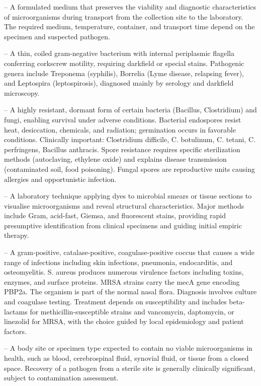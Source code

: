 -- A formulated medium that preserves the viability and diagnostic characteristics of microorganisms during transport from the collection site to the laboratory. The required medium, temperature, container, and transport time depend on the specimen and suspected pathogen.

-- A thin, coiled gram-negative bacterium with internal periplasmic flagella conferring corkscrew motility, requiring darkfield or special stains. Pathogenic genera include Treponema (syphilis), Borrelia (Lyme disease, relapsing fever), and Leptospira (leptospirosis), diagnosed mainly by serology and darkfield microscopy.

-- A highly resistant, dormant form of certain bacteria (Bacillus, Clostridium) and fungi, enabling survival under adverse conditions. Bacterial endospores resist heat, desiccation, chemicals, and radiation; germination occurs in favorable conditions. Clinically important: Clostridium difficile, C. botulinum, C. tetani, C. perfringens, Bacillus anthracis. Spore resistance requires specific sterilization methods (autoclaving, ethylene oxide) and explains disease transmission (contaminated soil, food poisoning). Fungal spores are reproductive units causing allergies and opportunistic infection.

-- A laboratory technique applying dyes to microbial smears or tissue sections to visualise microorganisms and reveal structural characteristics. Major methods include Gram, acid-fast, Giemsa, and fluorescent stains, providing rapid presumptive identification from clinical specimens and guiding initial empiric therapy.

-- A gram-positive, catalase-positive, coagulase-positive coccus that causes a wide range of infections including skin infections, pneumonia, endocarditis, and osteomyelitis. S. aureus produces numerous virulence factors including toxins, enzymes, and surface proteins. MRSA strains carry the mecA gene encoding PBP2a. The organism is part of the normal nasal flora. Diagnosis involves culture and coagulase testing. Treatment depends on susceptibility and includes beta-lactams for methicillin-susceptible strains and vancomycin, daptomycin, or linezolid for MRSA, with the choice guided by local epidemiology and patient factors.

-- A body site or specimen type expected to contain no viable microorganisms in health, such as blood, cerebrospinal fluid, synovial fluid, or tissue from a closed space. Recovery of a pathogen from a sterile site is generally clinically significant, subject to contamination assessment.

